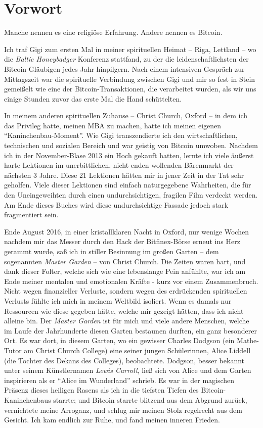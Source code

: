\chapter*{Vorwort}

Manche nennen es eine religiöse Erfahrung. Andere nennen es Bitcoin.

Ich traf Gigi zum ersten Mal in meiner spirituellen Heimat -- Riga, Lettland --
wo die \textit{Baltic Honeybadger} Konferenz stattfand, zu der die
leidenschaftlichsten der Bitcoin-Gläubigen jedes Jahr hinpilgern. Nach einem
intensiven Gespräch zur Mittagszeit war die spirituelle Verbindung zwischen Gigi
und mir so fest in Stein gemeißelt wie eine der Bitcoin-Transaktionen, die
verarbeitet wurden, als wir uns einige Stunden zuvor das erste Mal die Hand
schüttelten.

In meinem anderen spirituellen Zuhause -- Christ Church, Oxford -- in dem ich
das Privileg hatte, meinen MBA zu machen, hatte ich meinen eigenen
\enquote{Kaninchenbau-Moment}. Wie Gigi transzendierte ich den wirtschaftlichen,
technischen und sozialen Bereich und war geistig von Bitcoin umwoben. Nachdem
ich in der November-Blase 2013 ein Hoch gekauft hatten, lernte ich viele äußerst
harte Lektionen im unerbittlichen, nicht-enden-wollenden Bärenmarkt der nächsten
3 Jahre. Diese 21 Lektionen hätten mir in jener Zeit in der Tat sehr geholfen.
Viele dieser Lektionen sind einfach naturgegebene Wahrheiten, die für den
Uneingeweihten durch einen undurchsichtigen, fragilen Film verdeckt werden. Am
Ende dieses Buches wird diese undurchsichtige Fassade jedoch stark fragmentiert
sein.

Ende August 2016, in einer kristallklaren Nacht in Oxford, nur wenige Wochen
nachdem mir das Messer durch den Hack der Bitfinex-Börse erneut ins Herz
gerammt wurde, saß ich in stiller Besinnung im großen Garten -- dem
sogenannten \textit{Master Garden} -- von Christ Church. Die Zeiten waren hart,
und dank dieser Folter, welche sich wie eine lebenslange Pein anfühlte, war ich
am Ende meiner mentalen und emotionalen Kräfte - kurz vor einem Zusammenbruch.
Nicht wegen finanzieller Verluste, sondern wegen des erdrückenden spirituellen
Verlusts fühlte ich mich in meinem Weltbild isoliert. Wenn es damals nur
Ressourcen wie diese gegeben hätte, welche mir gezeigt hätten, dass ich nicht
alleine bin. Der \textit{Master Garden} ist für mich und viele andere Menschen,
welche im Laufe der Jahrhunderte diesen Garten bestaunen durften, ein ganz
besonderer Ort. Es war dort, in diesem Garten, wo ein gewisser Charles Dodgson
(ein Mathe-Tutor am Christ Church College) eine seiner jungen Schülerinnen,
Alice Liddell (die Tochter des Dekans des Colleges), beobachtete. Dodgson,
besser bekannt unter seinem Künstlernamen \textit{Lewis Carroll}, ließ sich von
Alice und dem Garten inspirieren als er \enquote{Alice im Wunderland} schrieb.
Es war in der magischen Präsenz dieses heiligen Rasens als ich in die tiefsten
Tiefen des Bitcoin-Kaninchenbaus starrte; und Bitcoin starrte blitzend aus dem
Abgrund zurück, vernichtete meine Arroganz, und schlug mir meinen Stolz
regelrecht aus dem Gesicht. Ich kam endlich zur Ruhe, und fand meinen inneren
Frieden.

